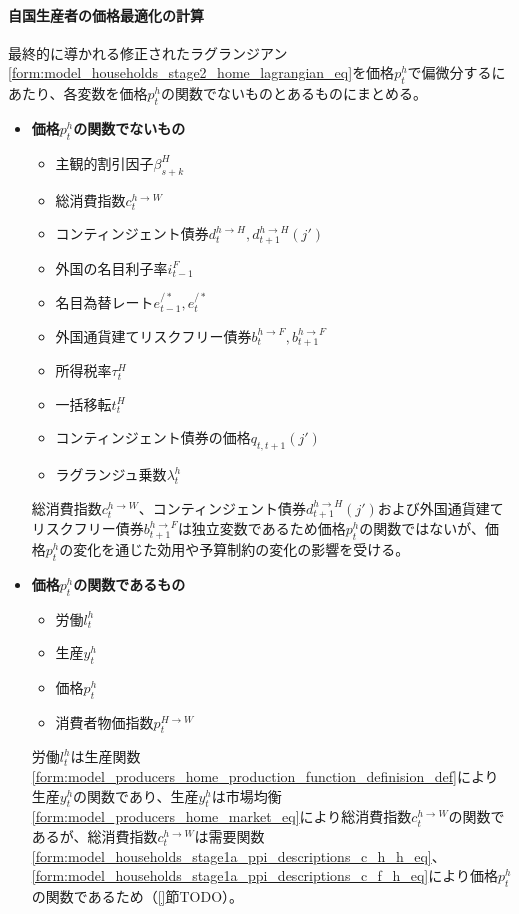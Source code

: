 \paragraph{自国生産者の価格最適化の計算}
\label{sec:chapter3_assumptions_producer_optimization_home_calculation}
最終的に導かれる修正されたラグランジアン\eqref{form:model_households_stage2_home_lagrangian_eq}を価格\(p_t^h\)で偏微分するにあたり、各変数を価格\(p_t^h\)の関数でないものとあるものにまとめる。
\begin{itemize}
    \item
    \label{itm:chapter3_assumptions_producer_optimization_home_calculation_remark1}
        \textbf{価格\(p_t^h\)の関数でないもの}
        \begin{itemize}
            \item 主観的割引因子\(\beta_{s+k}^H\)
            \item 総消費指数\(c_t^{h\to W}\)
            \item コンティンジェント債券\(d_t^{h\to H}, d_{t+1}^{h\to H}(j')\)
            \item 外国の名目利子率\(i_{t-1}^F\)
            \item 名目為替レート\(e_{t-1}^{/*}, e_t^{/*}\)
            \item 外国通貨建てリスクフリー債券\(b_t^{h\to F}, b_{t+1}^{h\to F}\)
            \item 所得税率\(\tau_t^H\)
            \item 一括移転\(t_t^H\)
            \item コンティンジェント債券の価格\(q_{t,t+1}(j')\)
            \item ラグランジュ乗数\(\lambda_t^h\)
        \end{itemize}
        総消費指数\(c_t^{h\to W}\)、コンティンジェント債券\(d_{t+1}^{h\to H}(j')\)および外国通貨建てリスクフリー債券\(b_{t+1}^{h\to F}\)は独立変数であるため価格\(p_t^h\)の関数ではないが、価格\(p_t^h\)の変化を通じた効用や予算制約の変化の影響を受ける。
    \item
    \label{itm:chapter3_assumptions_producer_optimization_home_calculation_remark2}
        \textbf{価格\(p_t^h\)の関数であるもの}
        \begin{itemize}
            \item 労働\(l_t^h\)
            \item 生産\(y_t^h\)
            \item 価格\(p_t^h\)
            \item 消費者物価指数\(p_t^{H\to W}\)
        \end{itemize}
        労働\(l_t^h\)は生産関数\eqref{form:model_producers_home_production_function_definision_def}により生産\(y_t^h\)の関数であり、生産\(y_t^h\)は市場均衡\eqref{form:model_producers_home_market_eq}により総消費指数\(c_t^{h\to W}\)の関数であるが、総消費指数\(c_t^{h\to W}\)は需要関数\eqref{form:model_households_stage1a_ppi_descriptions_c_h_h_eq}、\eqref{form:model_households_stage1a_ppi_descriptions_c_f_h_eq}により価格\(p_t^h\)の関数であるため（\ref{}節TODO）。
\end{itemize}
